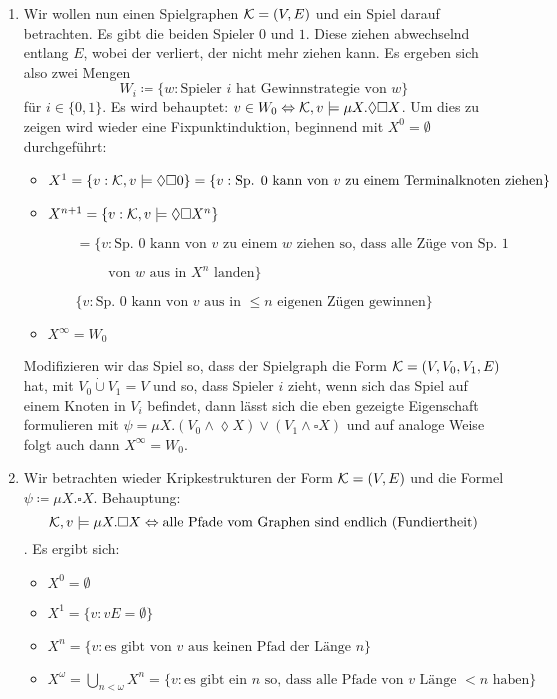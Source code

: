 \begin{enumerate}
	\item Wir wollen nun einen Spielgraphen $\mathcal{K}=(V,E)$ und ein Spiel darauf betrachten. Es gibt die beiden Spieler $0$ und $1$. Diese ziehen abwechselnd entlang $E$, wobei der verliert, der nicht mehr ziehen kann. Es ergeben sich also zwei Mengen $$W_i\coloneqq \{w : \text{Spieler } i \text{ hat Gewinnstrategie von } w\}$$ für $i\in \{0,1\}$. Es wird behauptet: $v\in W_0 \Leftrightarrow \mathcal{K},v \models \mu X.\lozenge \square X$. Um dies zu zeigen wird wieder eine Fixpunktinduktion, beginnend mit $X^0=\emptyset$ durchgeführt:
	\begin{itemize}
		\item $X^1=\{v : \mathcal{K},v\models \lozenge\square 0\} = \{v : \text{Sp. } 0 \text{ kann von } v \text{ zu einem Terminalknoten ziehen}\}$
		\item $X^{n+1} = \{v : \mathcal{K},v\models \lozenge\square X^n\}$
		
		$\qquad = \{v : \text{Sp. } 0 \text{ kann von } v \text{ zu einem } w \text{ ziehen so, dass alle Züge von Sp. } 1$ 
		
		$\qquad\qquad \text{ von } w \text{ aus in } X^n \text{ landen}\}$
		
		$\qquad \{v : \text{Sp. } 0 \text{ kann von } v \text{ aus in } \leq n \text{ eigenen Zügen gewinnen}\}$
		\item $X^\infty = W_0$
	\end{itemize}
	
	Modifizieren wir das Spiel so, dass der Spielgraph die Form $\mathcal{K}=(V,V_0,V_1,E)$ hat, mit $V_0\dot{\cup}V_1=V$ und so, dass Spieler $i$ zieht, wenn sich das Spiel auf einem Knoten in $V_i$ \glqq befindet\grqq{}, dann lässt sich die eben gezeigte Eigenschaft formulieren mit $\psi=\mu X . (V_0\land \lozenge X)\lor (V_1 \land \square X)$ und auf analoge Weise folgt auch dann $X^\infty=W_0$.
	
	\item Wir betrachten wieder Kripkestrukturen der Form $\mathcal{K}=(V,E)$ und die Formel $\psi\coloneqq \mu X . \square X$. Behauptung: $$\mathcal{K},v\models \mu X.\square X \Leftrightarrow \text{alle Pfade vom Graphen sind endlich (Fundiertheit)}$$. Es ergibt sich:
	\begin{itemize}
		\item $X^0 = \emptyset$
		\item $X^1 = \{v :vE =\emptyset\}$
		\item $X^n = \{v : \text{es gibt von } v \text{ aus keinen Pfad der Länge } n\}$
		\item $X^\omega = \bigcup_{n<\omega}X^n=\{v : \text{es gibt ein } n \text{ so, dass alle Pfade von } v \text{ Länge } <n \text{ haben}\}$
	\end{itemize}
	

\end{enumerate}
